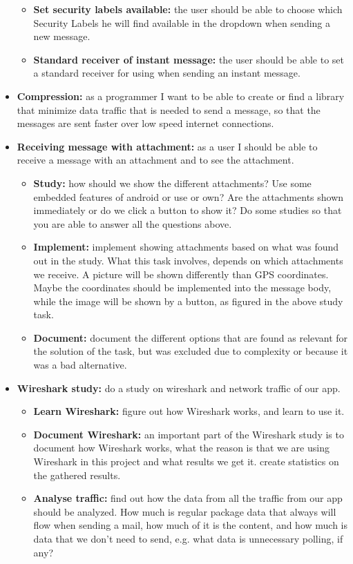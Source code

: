 \begin{itemize}
\begin{itemize}
\item{}\textbf{Set security labels available:} the user should be able to choose which Security Labels he will find available in the dropdown when sending a new message.
\item{}\textbf{Standard receiver of instant message:} the user should be able to set a standard receiver for using when sending an instant message.
\end{itemize}
\item{}\textbf{Compression:} as a programmer I want to be able to create or find a library that minimize data traffic that is needed to send a message, so that the messages are sent faster over low speed internet connections.
\item{}\textbf{Receiving message with attachment:} as a user I should be able to receive a message with an attachment and to see the attachment.
\begin{itemize}
\item{}\textbf{Study:} how should we show the different attachments? Use some embedded features of android or use or own? Are the attachments shown immediately or do we click a button to show it? Do some studies so that you are able to answer all the questions above.
\item{}\textbf{Implement:} implement showing attachments based on what was found out in the study. What this task involves, depends on which attachments we receive. A picture will be shown differently than GPS coordinates. Maybe the coordinates should be implemented into the message body, while the image will be shown by a button, as figured in the above study task.
\item{}\textbf{Document:} document the different options that are found as relevant for the solution of the task, but was excluded due to complexity or because it was a bad alternative.
\end{itemize}
\item{}\textbf{Wireshark study:} do a study on wireshark and network traffic of our app.
\begin{itemize}
\item{}\textbf{Learn Wireshark:} figure out how Wireshark works, and learn to use it.
\item{}\textbf{Document Wireshark:} an important part of the Wireshark study is to document how Wireshark works, what the reason is that we are using Wireshark in this project and what results we get it. create statistics on the gathered results.
\item{}\textbf{Analyse traffic:} find out how the data from all the traffic from our app should be analyzed. How much is regular package data that always will flow when sending a mail, how much of it is the content, and how much is data that we don’t need to send, e.g. what data is unnecessary polling, if any?

\end{itemize}
\end{itemize}
